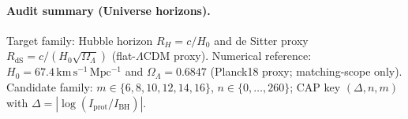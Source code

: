 \paragraph{Audit summary (Universe horizons).} \AuditTag Target family: Hubble horizon $R_H=c/H_0$ and de Sitter proxy $R_{\mathrm{dS}}=c/(H_0\sqrt{\Omega_\Lambda})$ (flat-$\Lambda$CDM proxy).
\noindent\AuditTag Numerical reference: $H_0=67.4\,\mathrm{km\,s^{-1}\,Mpc^{-1}}$ and $\Omega_\Lambda=0.6847$ (Planck18 proxy; matching-scope only).
\noindent\AuditTag Candidate family: $m\in\{6,8,10,12,14,16\}$, $n\in\{0,\dots,260\}$; CAP key $(\Delta,n,m)$ with $\Delta=|\log(I_{\mathrm{prot}}/I_{\mathrm{BH}})|$.
